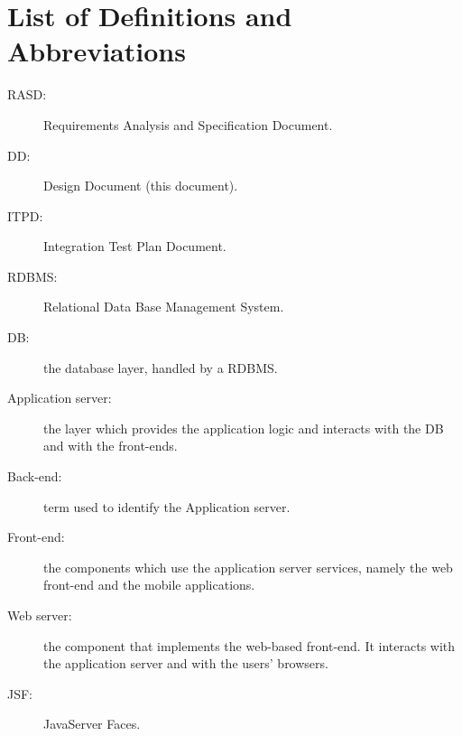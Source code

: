 \section{List of Definitions and Abbreviations}
\label{sec:definitions}

\begin{description}
\item[RASD:] Requirements Analysis and Specification Document.
\item[DD:] Design Document (this document).
\item[ITPD:] Integration Test Plan Document.
\item[RDBMS:] Relational Data Base Management System.
\item[DB:] the database layer, handled by a RDBMS.
\item[Application server:] the layer which provides the application logic and interacts with the DB and with the front-ends.
\item[Back-end:] term used to identify the Application server.
\item[Front-end:] the components which use the application server services, namely the web front-end and the mobile applications.
\item[Web server:] the component that implements the web-based front-end. It interacts with the application server and with the users' browsers.
\item[JSF:] JavaServer Faces.
\end{description}
